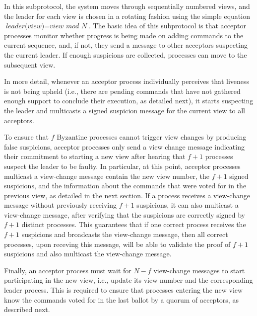 In this subprotocol, the system moves through sequentially numbered views, and the leader for each view is chosen in a rotating fashion using the simple equation $\textit{leader(view)}=\textit{view mod N}$. The basic idea of this subprotocol is that acceptor processes monitor whether progress is being made on adding commands to the current sequence, and, if not, they send a message to other acceptors suspecting the current leader. If enough suspicions are collected, processes can move to the subsequent view.

In more detail, whenever an acceptor process individually perceives that liveness is not being upheld (i.e., there are pending commands that have not gathered enough support to conclude their execution, as detailed next), it starts suspecting the leader and multicasts a signed {\sc suspicion} message for the current view to all acceptors.

To ensure that $f$ Byzantine processes cannot trigger view changes by producing  false suspicions, acceptor processes only send a view change message indicating their commitment to starting a new view after hearing that $f+1$ processes suspect the leader to be faulty. In particular, at this point, acceptor processes multicast a view-change message contain the new view number, the $f+1$ signed suspicions, and the information about the commands that were voted for in the previous view, as detailed in the next section. If a process receives a view-change message without previously receiving $f+1$ suspicions, it can also multicast a view-change message, after verifying that the suspicions are correctly signed by $f+1$ distinct processes.
This guarantees that if one correct process receives the $f+1$ suspicions and broadcasts the view-change message, then all correct processes, upon receving this message, will be able to validate the proof of $f+1$ suspicions and also multicast the view-change message.


Finally, an acceptor process must wait for $N-f$ view-change messages to start participating in the new view, i.e., update its view number and the corresponding leader process. This is required to ensure that processes entering the new view know the commands voted for in the last ballot by a quorum of acceptors, as described next.


